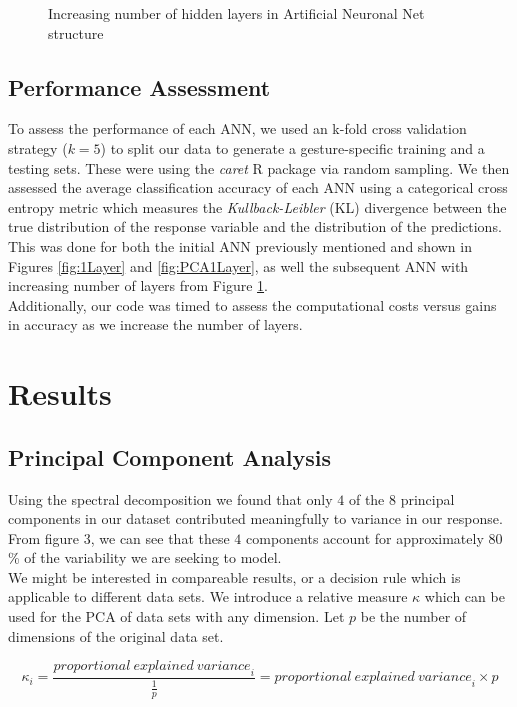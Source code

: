 \documentclass{article}
\begin{document}
\begin{figure}[h]
\begin{subfigure}{.6\textwidth}
\end{subfigure}
\caption{Increasing number of hidden layers in Artificial Neuronal Net structure}
\label{fig:5Layers}
\end{figure}

\subsection{Performance Assessment}
To assess the performance of each ANN, we used an k-fold cross validation strategy ($k =5$) to split our data to generate a gesture-specific training and a testing sets. These were using the \textit{caret} R package via random sampling. We then assessed the average classification accuracy of each ANN using a categorical cross entropy metric which measures the \textit{Kullback-Leibler} (KL) divergence between the true distribution of the response variable and the distribution of the predictions. This was done for both the initial ANN previously mentioned and shown in Figures \ref{fig:1Layer} and \ref{fig:PCA1Layer}, as well the subsequent ANN with increasing number of layers from Figure \ref{fig:5Layers}.\\
Additionally, our code was timed to assess the computational costs versus gains in accuracy as we increase the number of layers.


\section{Results}

\subsection{Principal Component Analysis}

Using the spectral decomposition we found that only $4$ of the $8$ principal components in our dataset contributed meaningfully to variance in our response. From figure $3$, we can see that these $4$ components account for approximately $80$\% of the variability we are seeking to model.\\
We might be interested in compareable results, or a decision rule which is applicable to different data sets. We introduce a relative measure $\kappa$ which can be used for the PCA of data sets with any dimension. Let $p$ be the number of dimensions of the original data set.

\[\kappa_i=\frac{{proportional\ explained\ variance}_i}{\frac{1}{p}}={proportional\ explained\ variance}_i\times p\]
\end{document}
